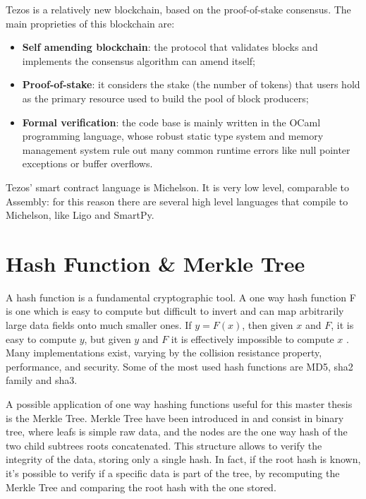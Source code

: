 Tezos \cite{allombert_introduction_2019} is a relatively new blockchain, based on the proof-of-stake consensus. The main proprieties of this blockchain are:
\begin{itemize}
      \item \textbf{Self amending blockchain}: the protocol that validates blocks and implements the consensus algorithm can amend itself;
            \vspace{-0.11in}
      \item \textbf{Proof-of-stake}: it considers the stake (the number of tokens) that users hold as the primary resource used to build the pool of block producers;
            \vspace{-0.11in}
      \item \textbf{Formal verification}: the code base is mainly written in the OCaml programming language, whose robust static type system and memory management system rule out many common runtime errors like null pointer exceptions or buffer overflows.
\end{itemize}

Tezos' smart contract language is Michelson. It is very low level, comparable to Assembly: for this reason there are several high level languages that compile to Michelson, like Ligo and SmartPy. 

\section{Hash Function \& Merkle Tree}

A hash function is a fundamental cryptographic tool. A one way hash function F is one which is easy to compute but difficult to invert and can map arbitrarily large data fields onto much smaller ones. If $y = F(x)$, then given $x$ and $F$, it is easy to compute $y$, but given $y$ and $F$ it is effectively impossible to compute $x$ \cite{merkle_secrecy_1979}. Many implementations exist, varying by the collision resistance property, performance, and security. Some of the most used hash functions are MD5, sha2 family and sha3.

A possible application of one way hashing functions useful for this master thesis is the Merkle Tree. Merkle Tree have been introduced in \cite{merkle_secrecy_1979} and consist in binary tree, where leafs is simple raw data, and the nodes are the one way hash of the two child subtrees roots concatenated. This structure allows to verify the integrity of the data, storing only a single hash. In fact, if the root hash is known, it's possible to verify if a specific data is part of the tree, by recomputing the Merkle Tree and comparing the root hash with the one stored.

